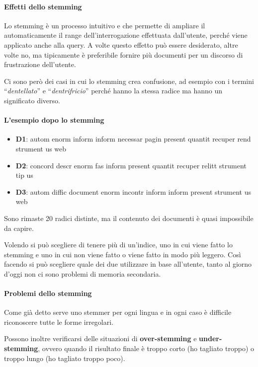 \paragraph{Effetti dello stemming}

Lo stemming è un processo intuitivo e che permette di ampliare il automaticamente il range dell'interrogazione effettuata dall'utente, perché viene applicato anche alla query. A volte questo effetto può essere desiderato, altre volte no, ma tipicamente è preferibile fornire più documenti per un discorso di frustrazione dell'utente.

Ci sono però dei casi in cui lo stemming crea confusione, ad esempio con i termini ``\textit{dentellato}'' e ``\textit{dentrifricio}'' perché hanno la stessa radice ma hanno un significato diverso.

\paragraph{L'esempio dopo lo stemming}

\begin{itemize}
	\item \textbf{D1}: autom enorm inform inform necessar pagin present quantit recuper rend strument us web
	\item \textbf{D2}: concord descr enorm fas inform present quantit recuper relitt strument tip us
	\item \textbf{D3}: autom diffic document enorm incontr inform inform present strument us web
\end{itemize}

Sono rimaste 20 radici distinte, ma il contenuto dei documenti è quasi impossibile da capire.

Volendo si può scegliere di tenere più di un'indice, uno in cui viene fatto lo stemming e uno in cui non viene fatto o viene fatto in modo più leggero. Così facendo si può scegliere quale dei due utilizzare in base all'utente, tanto al giorno d'oggi non ci sono problemi di memoria secondaria.

\paragraph{Problemi dello stemming}

Come già detto serve uno stemmer per ogni lingua e in ogni caso è difficile riconoscere tutte le forme irregolari.

Possono inoltre verificarsi delle situazioni di \textbf{over-stemming} e \textbf{under-stemming}, ovvero quando il risultato finale è troppo corto (ho tagliato troppo) o troppo lungo (ho tagliato troppo poco).













